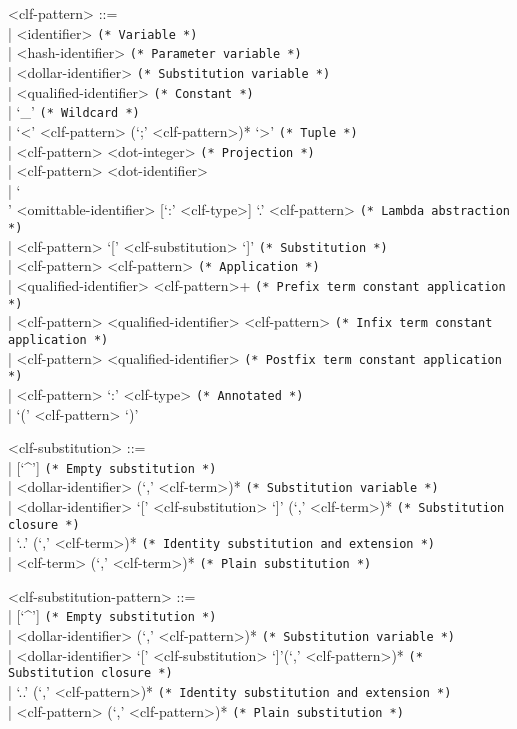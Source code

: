 \documentclass[11pt]{article}
\begin{document}
\begin{grammar}
<clf-pattern> ::= \hfill\\
| <identifier> \hfill \texttt{(* Variable *)}\\
| <hash-identifier> \hfill \texttt{(* Parameter variable *)}\\
| <dollar-identifier> \hfill \texttt{(* Substitution variable *)}\\
| <qualified-identifier> \hfill \texttt{(* Constant *)}\\
| `_' \hfill \texttt{(* Wildcard *)}\\
| `<' <clf-pattern> (`;' <clf-pattern>)* `>' \hfill \texttt{(* Tuple *)}\\
| <clf-pattern> <dot-integer> \hfill \texttt{(* Projection *)}\\
| <clf-pattern> <dot-identifier>\\
| `\\' <omittable-identifier> [`:' <clf-type>] `.' <clf-pattern> \hfill \texttt{(* Lambda abstraction *)}\\
| <clf-pattern> `[' <clf-substitution> `]' \hfill \texttt{(* Substitution *)}\\
| <clf-pattern> <clf-pattern> \hfill \texttt{(* Application *)}\\
| <qualified-identifier> <clf-pattern>+ \hfill \texttt{(* Prefix term constant application *)}\\
| <clf-pattern> <qualified-identifier> <clf-pattern> \hfill \texttt{(* Infix term constant application *)}\\
| <clf-pattern> <qualified-identifier> \hfill \texttt{(* Postfix term constant application *)}\\
| <clf-pattern> `:' <clf-type> \hfill \texttt{(* Annotated *)}\\
| `(' <clf-pattern> `)'

<clf-substitution> ::= \hfill\\
| [`^'] \hfill \texttt{(* Empty substitution *)} \\
| <dollar-identifier> (`,' <clf-term>)* \hfill \texttt{(* Substitution variable *)}\\
| <dollar-identifier> `[' <clf-substitution> `]' (`,' <clf-term>)* \hfill \texttt{(* Substitution closure *)}\\
| `..' (`,' <clf-term>)* \hfill \texttt{(* Identity substitution and extension *)}\\
| <clf-term> (`,' <clf-term>)* \hfill \texttt{(* Plain substitution *)}

<clf-substitution-pattern> ::= \hfill\\
| [`^'] \hfill \texttt{(* Empty substitution *)} \\
| <dollar-identifier> (`,' <clf-pattern>)* \hfill \texttt{(* Substitution variable *)}\\
| <dollar-identifier> `[' <clf-substitution> `]'(`,' <clf-pattern>)* \hfill \texttt{(* Substitution closure *)}\\
| `..' (`,' <clf-pattern>)* \hfill \texttt{(* Identity substitution and extension *)}\\
| <clf-pattern> (`,' <clf-pattern>)* \hfill \texttt{(* Plain substitution *)}


\end{grammar}
\end{document}
